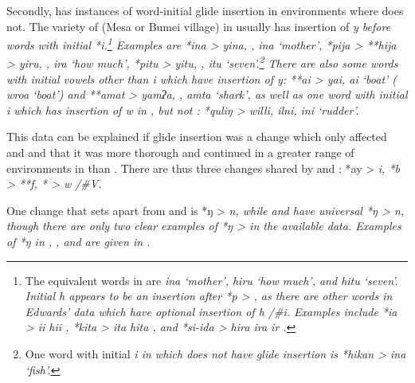 Secondly,  has instances of word-initial glide insertion
in environments where  does not.
The variety of  (Mesa or Bumei village) in \citet{Taber1993}
usually has insertion of \it{y} before words with initial *i.\footnote{
		The equivalent  words in \citet{Edwards2023} are \it{ina} ‘mother’,
		\it{hiru} ‘how much’, and \it{hitu} ‘seven’.
		Initial \it{h} appears to be an insertion after *p > {\0},
		as there are other words in Edwards’ data which have optional
		insertion of \it{h} /{\#}i{\gap}.
		Examples include *ia > \it{ii {\tl} hii} ,
		*kita > \it{ita {\tl} hita} ,
		and *si-ida > \it{hira {\tl} ira {\tl} ir} .}
Examples are *ina >  \it{yina},
,  \it{ina} ‘mother’, *pija > **hija >  \it{yiru},
,  \it{ira} ‘how much’,
*pitu > \it{yitu}, ,
 \it{itu} ‘seven’.\footnote{
		One word with initial \it{i}
		in  which does not have glide insertion
		is *hikan > \it{ina} ‘fish’.}
There are also some words with initial vowels other
than \it{i} which have insertion of \it{y}: **ai >  \it{yai},
 \it{ai} ‘boat’ ( \it{wroa} ‘boat’)
and **amat >  \it{yamʔa},
,  \it{amta} ‘shark’, as well as one word with initial
\it{i} which has insertion of \it{w} in ,
but not : *quliŋ >  \it{willi},
 \it{ilni},  \it{ini} ‘rudder’.

This data can be explained if glide insertion was a change which
only affected  and  and that it was more thorough
and continued in a greater range of environments in  than .
There are thus three changes shared by 
and : *ay > \it{i},
*b > **f, *{\0} > \it{w} /{\#}{\gap}V.

One change that sets  apart from 
and  is *ŋ > \it{n},
{\0} while  and  have universal
*ŋ > \it{n}, though there
are only two clear examples of *ŋ > {\0}
in the available  data.
Examples of *ŋ in ,
, and  are given in .

